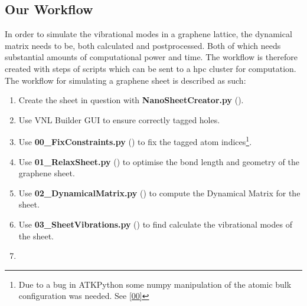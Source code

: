
\subsection{Our Workflow}
In order to simulate the vibrational modes in a graphene lattice, the dynamical matrix needs to be, both calculated and postprocessed. Both of which needs substantial amounts of computational power and time. The workflow is therefore created with steps of scripts which can be sent to a hpc cluster for computation.
The workflow for simulating a graphene sheet is described as such:
\begin{enumerate}
  \item Create the sheet in question with \textbf{NanoSheetCreator.py} ().
  \item Use VNL Builder GUI to ensure correctly tagged holes.
  \item Use \textbf{00\_FixConstraints.py} () to fix the tagged atom indices\footnote{Due to a bug in ATKPython some numpy manipulation of the atomic bulk configuration was needed. See \cref{00}}.
  \item Use \textbf{01\_RelaxSheet.py} () to optimise the bond length and geometry of the graphene sheet.
  \item Use \textbf{02\_DynamicalMatrix.py} () to compute the Dynamical Matrix for the sheet.
  \item Use \textbf{03\_SheetVibrations.py} () to find calculate the vibrational modes of the sheet.
  \item {}
\end{enumerate}

